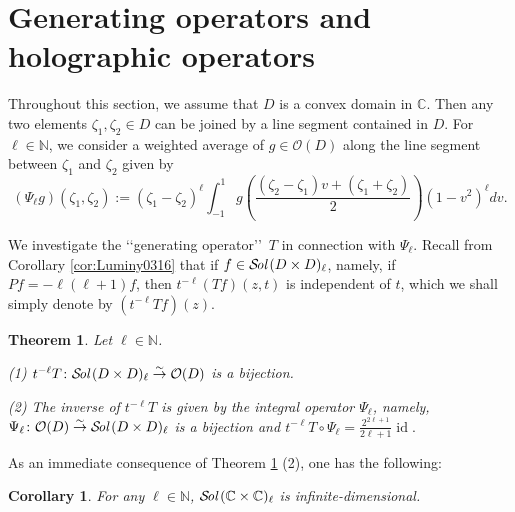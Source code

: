 \documentclass[12pt,leqno]{amsart}
\theoremstyle{plain}
\newtheorem{theorem}[thm]{Theorem}
\newtheorem{corollary}[thm]{Corollary}
\theoremstyle{definition}
\newcommand\Sol{{\mathcal {S}}\!{\text{\it{ol}}}\,}
\begin{document}
\section{Generating operators and holographic operators}
\label{sec:holographic}

Throughout this section, 
 we assume
 that $D$ is a convex domain in ${\mathbb{C}}$.  
Then any two elements $\zeta_1, \zeta_2 \in D$
 can be joined by a line segment contained in $D$.  
For $\ell \in {\mathbb{N}}$, 
 we consider a weighted average of $g \in {\mathcal{O}}(D)$
 along the line segment
 between $\zeta_1$ and $\zeta_2$
 given by 
\[
  (\Psi_{\ell} g)(\zeta_1, \zeta_2)
  :=(\zeta_1- \zeta_2)^{\ell}
    \int_{-1}^{1} 
      g(\frac{(\zeta_2-\zeta_1)v +(\zeta_1 + \zeta_2)}{2})(1-v^2)^{\ell}d v.  
\]



We investigate the \lq\lq{generating operator}\rq\rq\ $T$
 in connection with $\Psi_{\ell}$.  
Recall from Corollary \ref{cor:Luminy0316}
 that if $f \in \Sol(D \times D)_{\ell}$, 
 namely, 
 if $P f = -\ell(\ell+1) f$, 
 then $t^{-\ell}(T f)(z, t)$ is independent
 of $t$, 
 which we shall simply denote by 
 $(t^{-\ell} T f)(z)$.  



\begin{theorem}
\label{thm:Tlsol}
Let $\ell \in {\mathbb{N}}$.  
\par\noindent
{\rm{(1)}}\enspace
$t^{-\ell}T \colon \Sol(D \times D)_{\ell} \overset \sim \rightarrow {\mathcal{O}}(D)$
 is a bijection.  
\par\noindent
{\rm{(2)}}\enspace
The inverse of $t^{-\ell}T$ is given 
 by the integral operator $\Psi_{\ell}$, 
 namely, 
$
   \Psi_{\ell} \colon {\mathcal{O}}(D)
   \overset \sim \rightarrow
   \Sol(D \times D)_{\ell}
$
 is a bijection
 and 
$
  t^{-\ell} T \circ \Psi_{\ell}
  = \frac{2^{2\ell+1}}{2 \ell+1} \operatorname{id}.
$
\end{theorem}



As an immediate consequence of Theorem \ref{thm:Tlsol} (2), 
 one has the following:

\begin{corollary}
\label{cor:dimSol}
For any $\ell \in {\mathbb{N}}$, 
 $\Sol({\mathbb{C}} \times {\mathbb{C}})_{\ell}$ is infinite-dimensional.  
\end{corollary}
\end{document}
